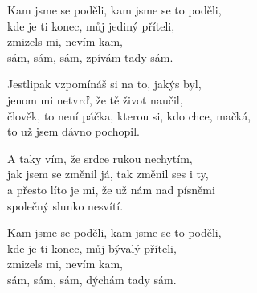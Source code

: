{\chorus{}Kam jsme se poděli, kam jsme se to poděli,\\
kde je ti konec, můj jediný příteli,\\
zmizels mi, nevím kam,\\
sám, sám, sám, zpívám tady sám.

Jestlipak vzpomínáš si na to, jakýs byl,\\
jenom mi netvrď, že tě život naučil,\\
člověk, to není páčka, kterou si, kdo chce, mačká,\\
to už jsem dávno pochopil.

A taky vím, že srdce rukou nechytím,\\
jak jsem se změnil já, tak změnil ses i ty,\\
a přesto líto je mi, že už nám nad písněmi\\
společný slunko nesvítí.

\chorus{}Kam jsme se poděli, kam jsme se to poděli,\\
kde je ti konec, můj bývalý příteli,\\
zmizels mi, nevím kam,\\
sám, sám, sám, dýchám tady sám.\\
}
